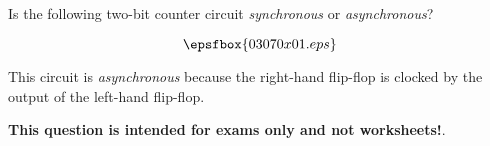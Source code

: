 

Is the following two-bit counter circuit {\it synchronous} or {\it asynchronous}?

$$\epsfbox{03070x01.eps}$$







This circuit is {\it asynchronous} because the right-hand flip-flop is clocked by the output of the left-hand flip-flop.







{\bf This question is intended for exams only and not worksheets!}.





